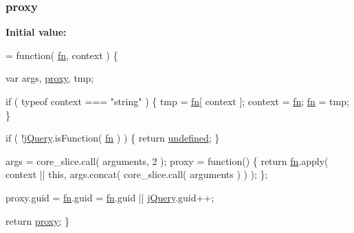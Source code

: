 \subsubsection[{proxy}]{ proxy}\label{jquery-1_810_82-vsdoc_8js_af0c0a2dd63f5d59bf5dea9f132dec59e}
{\bfseries Initial value\+:}
\begin{DoxyCode}
= \textcolor{keyword}{function}( \hyperlink{jquery-1_810_82-vsdoc_8js_acef6bdaf6b9b20fdcca1ea86f0902c3b}{fn}, context ) \{


        var args, \hyperlink{jquery-1_810_82-vsdoc_8js_af0c0a2dd63f5d59bf5dea9f132dec59e}{proxy}, tmp;

        \textcolor{keywordflow}{if} ( typeof context === \textcolor{stringliteral}{"string"} ) \{
            tmp = \hyperlink{jquery-1_810_82-vsdoc_8js_acef6bdaf6b9b20fdcca1ea86f0902c3b}{fn}[ context ];
            context = \hyperlink{jquery-1_810_82-vsdoc_8js_acef6bdaf6b9b20fdcca1ea86f0902c3b}{fn};
            \hyperlink{jquery-1_810_82-vsdoc_8js_acef6bdaf6b9b20fdcca1ea86f0902c3b}{fn} = tmp;
        \}

        
        
        \textcolor{keywordflow}{if} ( !\hyperlink{jquery-1_810_82-vsdoc_8js_add5237586d970a38a81f990e8eb28c6c}{jQuery}.isFunction( \hyperlink{jquery-1_810_82-vsdoc_8js_acef6bdaf6b9b20fdcca1ea86f0902c3b}{fn} ) ) \{
            \textcolor{keywordflow}{return} \hyperlink{jquery-1_810_82-vsdoc_8js_a08113a236cc18d2a9d5ce27e638012be}{undefined};
        \}

        
        args = core\_slice.call( arguments, 2 );
        proxy = \textcolor{keyword}{function}() \{
            \textcolor{keywordflow}{return} \hyperlink{jquery-1_810_82-vsdoc_8js_acef6bdaf6b9b20fdcca1ea86f0902c3b}{fn}.apply( context || \textcolor{keyword}{this}, args.concat( core\_slice.call( arguments ) ) );
        \};

        
        proxy.guid = \hyperlink{jquery-1_810_82-vsdoc_8js_acef6bdaf6b9b20fdcca1ea86f0902c3b}{fn}.guid = \hyperlink{jquery-1_810_82-vsdoc_8js_acef6bdaf6b9b20fdcca1ea86f0902c3b}{fn}.guid || \hyperlink{jquery-1_810_82-vsdoc_8js_add5237586d970a38a81f990e8eb28c6c}{jQuery}.guid++;

        \textcolor{keywordflow}{return} \hyperlink{jquery-1_810_82-vsdoc_8js_af0c0a2dd63f5d59bf5dea9f132dec59e}{proxy};
    \}
\end{DoxyCode}
\hypertarget{jquery-1_810_82-vsdoc_8js_afc3a7db1ef2b526338c06c07cecccd44}{}

